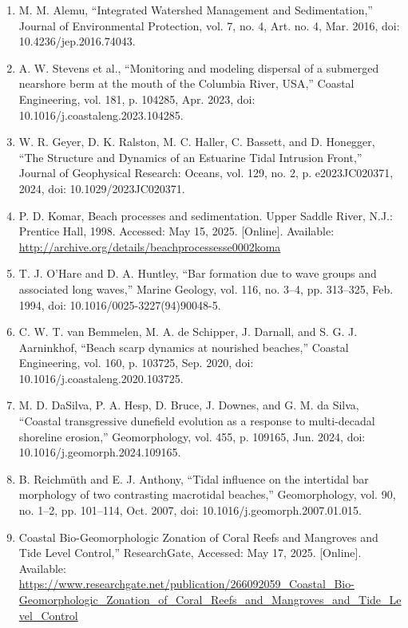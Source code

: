 \documentclass{article}
\begin{document}
\begin{sloppypar}
\begin{enumerate}
    \item{M. M. Alemu, “Integrated Watershed Management and Sedimentation,” Journal of Environmental Protection, vol. 7, no. 4, Art. no. 4, Mar. 2016, doi: 10.4236/jep.2016.74043.}

    \item{A. W. Stevens et al., “Monitoring and modeling dispersal of a submerged nearshore berm at the mouth of the Columbia River, USA,” Coastal Engineering, vol. 181, p. 104285, Apr. 2023, doi: 10.1016/j.coastaleng.2023.104285.}

    \item{W. R. Geyer, D. K. Ralston, M. C. Haller, C. Bassett, and D. Honegger, “The Structure and Dynamics of an Estuarine Tidal Intrusion Front,” Journal of Geophysical Research: Oceans, vol. 129, no. 2, p. e2023JC020371, 2024, doi: 10.1029/2023JC020371.}

    \item{P. D. Komar, Beach processes and sedimentation. Upper Saddle River, N.J.: Prentice Hall, 1998. Accessed: May 15, 2025. [Online]. Available: \url{http://archive.org/details/beachprocessesse0002koma}}

    \item{T. J. O’Hare and D. A. Huntley, “Bar formation due to wave groups and associated long waves,” Marine Geology, vol. 116, no. 3–4, pp. 313–325, Feb. 1994, doi: 10.1016/0025-3227(94)90048-5.}

    \item{C. W. T. van Bemmelen, M. A. de Schipper, J. Darnall, and S. G. J. Aarninkhof, “Beach scarp dynamics at nourished beaches,” Coastal Engineering, vol. 160, p. 103725, Sep. 2020, doi: 10.1016/j.coastaleng.2020.103725.}

    \item{M. D. DaSilva, P. A. Hesp, D. Bruce, J. Downes, and G. M. da Silva, “Coastal transgressive dunefield evolution as a response to multi-decadal shoreline erosion,” Geomorphology, vol. 455, p. 109165, Jun. 2024, doi: 10.1016/j.geomorph.2024.109165.}

    \item{B. Reichmüth and E. J. Anthony, “Tidal influence on the intertidal bar morphology of two contrasting macrotidal beaches,” Geomorphology, vol. 90, no. 1–2, pp. 101–114, Oct. 2007, doi: 10.1016/j.geomorph.2007.01.015.}

    \item{Coastal Bio-Geomorphologic Zonation of Coral Reefs and Mangroves and Tide Level Control,” ResearchGate, Accessed: May 17, 2025. [Online]. Available: \url{https://www.researchgate.net/publication/266092059_Coastal_Bio-Geomorphologic_Zonation_of_Coral_Reefs_and_Mangroves_and_Tide_Level_Control}}


\end{enumerate}
\end{sloppypar}
\end{document}
